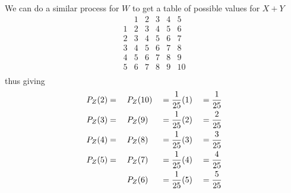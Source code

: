 \documentclass{eeleyes}
\begin{document}
We can do a similar process for $W$ to get a table of possible values for $X+Y$
\[
    \begin{array}{c||c|c|c|c|c}
          & 1  & 2  & 3  &  4 & 5  \\\hline\hline
        1 & 2  & 3  & 4  & 5  & 6  \\\hline
        2 & 3  & 4  & 5  & 6  & 7  \\\hline
        3 & 4  & 5  & 6  & 7  & 8  \\\hline
        4 & 5  & 6  & 7  & 8  & 9  \\\hline
        5 & 6  & 7  & 8  & 9  & 10 \\
    \end{array}
\]
thus giving
\begin{alignat*}{7}
    P_Z(2) &=\;&& P_Z(10) &&= \frac{1}{25}\qty(1) &&= \frac{1}{25} \\
    P_Z(3) &=&& P_Z(9) &&= \frac{1}{25}\qty(2) &&= \frac{2}{25} \\
    P_Z(4) &=&& P_Z(8) &&= \frac{1}{25}\qty(3) &&= \frac{3}{25} \\
    P_Z(5) &=&& P_Z(7) &&= \frac{1}{25}\qty(4) &&= \frac{4}{25} \\
           & && P_Z(6) &&= \frac{1}{25}\qty(5) &&= \frac{5}{25}
\end{alignat*}
\end{document}
